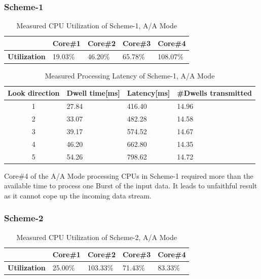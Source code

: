 \subsubsection{Scheme-1}
\begin{table}[h!]
	\centering
	\begin{tabular}{|l|l|l|l|l|} 
	 \hline
	& \textbf{Core\#1} & \textbf{Core\#2} & \textbf{Core\#3} & \textbf{Core\#4} \\ \hline
	\textbf{Utilization} & 19.03\% & 46.20\% & 65.78\% & {\color{red} 108.07\%} \\ \hline
	\end{tabular}
	\caption{Measured CPU Utilization of Scheme-1, A/A Mode}
	\label{tbl:mm:scheme1_true_util}
\end{table}

\begin{table}[h!]
	\centering
	\begin{tabular}{|c|l|l|l|} 
	 \hline
	 \textbf{Look direction} & \textbf{Dwell time[ms]} & \textbf{Latency[ms]} & \textbf{\#Dwells transmitted} \\
	 \hline
	 1 & 27.84 & 416.40 & 14.96 \\ \hline
	 2 & 33.07 & 482.28 & 14.58 \\ \hline
	 3 & 39.17 & 574.52 & 14.67 \\ \hline
	 4 & 46.20 & 662.80 & 14.35 \\ \hline
	 5 & 54.26 & 798.62 & 14.72 \\ \hline
	\end{tabular}
	\caption{Measured Processing Latency of Scheme-1, A/A Mode}
	\label{tbl:mm:scheme1_true_latency}
\end{table}
Core\#4 of the A/A Mode processing CPUs in Scheme-1 required more than the available time to process one Burst of the input data. It leads to unfaithful result as it cannot cope up the incoming data stream.
\FloatBarrier

\subsubsection{Scheme-2}
\begin{table}[h!]
	\centering
	\begin{tabular}{|l|l|l|l|l|} 
	 \hline
	& \textbf{Core\#1} & \textbf{Core\#2} & \textbf{Core\#3} & \textbf{Core\#4} \\ \hline
	\textbf{Utilization} & 25.00\% & {\color{red} 103.33\%} & 71.43\% & 83.33\% \\ \hline
	\end{tabular}
	\caption{Measured CPU Utilization of Scheme-2, A/A Mode}
	\label{tbl:mm:scheme2_true_util}
\end{table}

